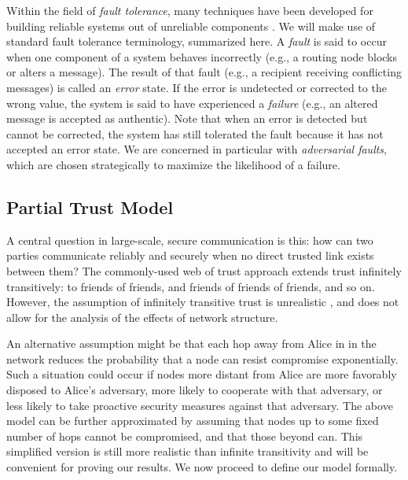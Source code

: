 \documentclass[twocolumn]{article}
\begin{document}
Within the field of {\em fault tolerance},
many techniques have been developed for building reliable systems
out of unreliable components
\cite{avizienis_basic_2004, von_neumann_probabilistic_1956}.
We will make use of standard fault tolerance terminology, summarized here.
A {\em fault} is said to occur when one component
of a system behaves incorrectly (e.g., a routing node blocks or
alters a message).
The result of that fault (e.g., a recipient receiving conflicting messages)
is called an {\em error} state.
If the error is undetected or corrected to the wrong value, the system is
said to have experienced a {\em failure} (e.g., an altered message is
accepted as authentic).
Note that when an error is detected but cannot be corrected,
the system has still tolerated the fault because it has not accepted an error
state.
We are concerned in particular with {\em adversarial faults},
which are chosen strategically to maximize the likelihood of a failure.

\subsection{Partial Trust Model}

A central question in large-scale, secure communication is this:
how can two parties communicate reliably and securely
when no direct trusted link exists between them?
The commonly-used web of trust approach
\cite{zimmermann_official_1995,ferguson_practical_2003}
extends trust infinitely transitively:
to friends of friends, and friends of friends of friends, and so on.
However, the assumption of infinitely transitive trust is unrealistic
\cite{christianson_why_1997},
and does not allow for the analysis of the effects of network structure.

An alternative assumption might be that each hop away from Alice in
in the network
reduces the probability that a node can resist compromise exponentially.
Such a situation could occur if nodes more distant from Alice are
more favorably disposed to Alice's adversary, more likely to cooperate with that
adversary, or less likely to take proactive security measures against that
adversary.
The above model can be further
approximated by assuming that nodes up to some fixed number
of hops cannot be compromised, and that those beyond can.
This simplified version is still more realistic than infinite transitivity
and will be convenient for proving our results.
We now proceed to define our model formally.
\end{document}
